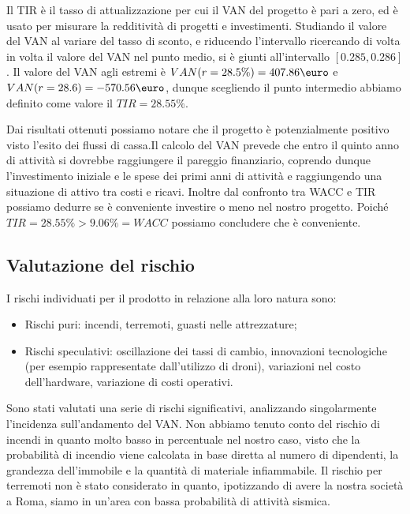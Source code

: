 Il TIR è il tasso di attualizzazione per cui il VAN del progetto è pari a zero, 
ed è usato per misurare la redditività di progetti e investimenti.
Studiando il valore del VAN al variare del tasso di sconto, e riducendo
l’intervallo ricercando di volta in volta il valore del VAN nel punto medio,
si è giunti all’intervallo \mbox{$[0.285, 0.286]$}. Il valore del VAN agli estremi è
$VAN(r = 28.5\%) = 407.86 \mbox{\euro}$ e $VAN(r=28.6) = -570.56 \mbox{\euro}$,
dunque scegliendo il punto intermedio abbiamo definito come valore il $TIR = 28.55\%$.

Dai risultati ottenuti possiamo notare che il progetto è potenzialmente positivo visto l'esito dei flussi di cassa.Il calcolo del VAN prevede che entro il quinto anno di attività si dovrebbe raggiungere il pareggio finanziario, coprendo dunque l’investimento iniziale e le spese dei primi anni di attività e raggiungendo una situazione di attivo tra costi e ricavi.
Inoltre dal confronto tra WACC e TIR possiamo dedurre se è conveniente investire o meno nel nostro progetto. Poiché $TIR = 28.55 \% > 9.06\% = WACC$ possiamo concludere che è conveniente.

\subsection{Valutazione del rischio}
I rischi individuati per il prodotto in relazione alla loro natura sono:
\begin{itemize}
\item Rischi puri: incendi, terremoti, guasti nelle attrezzature;
\item Rischi speculativi: oscillazione dei tassi di cambio, innovazioni
tecnologiche (per esempio rappresentate dall’utilizzo di droni), variazioni nel
costo dell’hardware, variazione di costi operativi.
\end{itemize}

Sono stati valutati una serie di rischi significativi, analizzando singolarmente
l’incidenza sull’andamento del VAN. Non abbiamo tenuto conto del rischio di
incendi in quanto molto basso in percentuale nel nostro caso, visto che la
probabilità di incendio viene calcolata in base diretta al numero di dipendenti,
la grandezza dell’immobile e la quantità di materiale infiammabile. Il rischio
per terremoti non è stato considerato in quanto, ipotizzando di avere la nostra
società a Roma, siamo in un’area con bassa probabilità di attività sismica.

